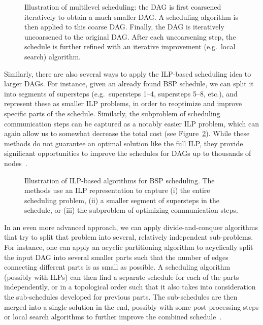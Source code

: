 \documentclass[oneside,reqno, a4paper]{amsart}
\numberwithin{equation}{section}
\begin{document}
\begin{figure}
	\centering
	\resizebox{1.0\textwidth}{!}{}
	\caption{Illustration of multilevel scheduling: the DAG is first coarsened iteratively to obtain a much smaller DAG. A scheduling algorithm is then applied to this coarse DAG. Finally, the DAG is iteratively uncoarsened to the original DAG. After each uncoarsening step, the schedule is further refined with an iterative improvement (e.g.\ local search) algorithm.}
	\label{fig:multilevel}
\end{figure}


Similarly, there are also several ways to apply the ILP-based scheduling idea to larger DAGs. For instance, given an already found BSP schedule, we can split it into segments of supersteps (e.g.\ supersteps 1--4, supersteps 5--8, etc.), and represent these as smaller ILP problems, in order to reoptimize and improve specific parts of the schedule. Similarly, the subproblem of scheduling communication steps can be captured as a notably easier ILP problem, which can again allow us to somewhat decrease the total cost (see Figure~\ref{fig:ilp_sched}). While these methods do not guarantee an optimal solution like the full ILP, they provide significant opportunities to improve the schedules for DAGs up to thousands of nodes~\cite{BSP_algos_opdas}.

\begin{figure}
	\centering
	\resizebox{0.6\textwidth}{!}{}
	\caption{Illustration of ILP-based algorithms for BSP scheduling. The methods use an ILP representation to capture (i) the entire scheduling problem, (ii) a smaller segment of supersteps in the schedule, or (iii) the subproblem of optimizing communication steps.}
	\label{fig:ilp_sched}
\end{figure}

In an even more advanced approach, we can apply divide-and-conquer algorithms that try to split that problem into several, relatively independent sub-problems. For instance, one can apply an acyclic partitioning algorithm to acyclically split the input DAG into several smaller parts such that the number of edges connecting different parts is as small as possible. A scheduling algorithm (possibly with ILPs) can then find a separate schedule for each of the parts independently, or in a topological order such that it also takes into consideration the sub-schedules developed for previous parts. The sub-schedules are then merged into a single solution in the end, possibly with some post-processing steps or local search algorithms to further improve the combined schedule~\cite{multiBSP_opdas}.
\end{document}
